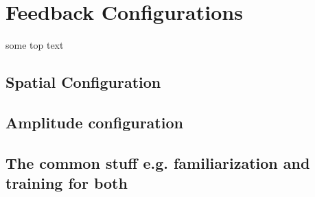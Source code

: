 \section{Feedback Configurations} \label{sec:feed}

some top text 


\subsection{Spatial Configuration}





\subsection{Amplitude configuration}



\subsection{The common stuff e.g. familiarization and training for both}
